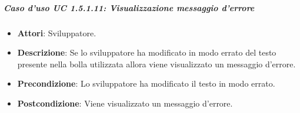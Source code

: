 \subparagraph{Caso d'uso UC 1.5.1.11: Visualizzazione messaggio d'errore}

\FloatBarrier
\begin{itemize}
\item\textbf{Attori}: Sviluppatore.
\item\textbf{Descrizione}: Se lo sviluppatore ha modificato in modo errato del testo presente nella bolla utilizzata allora viene visualizzato un messaggio d'errore.
\item\textbf{Precondizione}: Lo sviluppatore ha modificato il testo in modo errato.
\item\textbf{Postcondizione}: Viene visualizzato un messaggio d'errore.

\end{itemize}

